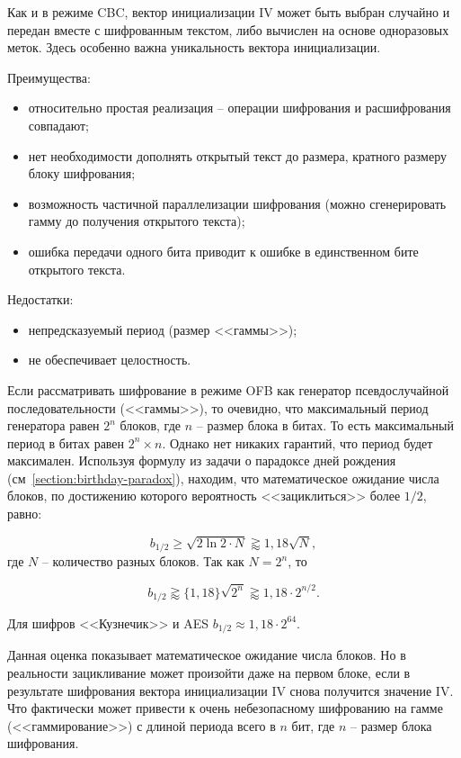 Как и в режиме CBC, вектор инициализации $\textrm{IV}$ может быть выбран случайно и передан вместе с шифрованным текстом, либо вычислен на основе одноразовых меток. Здесь особенно важна уникальность вектора инициализации.

Преимущества:
\begin{itemize}
	\item относительно простая реализация -- операции шифрования и расшифрования совпадают;
	\item нет необходимости дополнять открытый текст до размера, кратного размеру блоку шифрования;
	\item возможность частичной параллелизации шифрования (можно сгенерировать гамму до получения открытого текста);
	\item ошибка передачи одного бита приводит к ошибке в единственном бите открытого текста.
\end{itemize}

Недостатки:
\begin{itemize}
	\item непредсказуемый период (размер <<гаммы>>);
	\item не обеспечивает целостность.
\end{itemize}

Если рассматривать шифрование в режиме OFB как генератор псевдослучайной последовательности (<<гаммы>>), то очевидно, что максимальный период генератора равен $2^n$ блоков, где $n$ -- размер блока в битах. То есть максимальный период в битах равен $2^n \times n$. Однако нет никаких гарантий, что период будет максимален. Используя формулу из задачи о парадоксе дней рождения (см~\autoref{section:birthday-paradox}), находим, что математическое ожидание числа блоков, по достижению которого вероятность <<зациклиться>> более $1/2$, равно:

\[
b_{1/2} \geq \sqrt{2 \ln 2 \cdot N} \gtrapprox {1,18} \sqrt{N},
\]
где $N$ -- количество разных блоков. Так как $N = 2^n$, то

\[
b_{1/2} \gtrapprox \{1,18\} \sqrt{2^n} \gtrapprox {1,18} \cdot 2^{n/2}.
\]

Для шифров <<Кузнечик>> и AES $b_{1/2} \approx {1,18} \cdot 2^{64}$.

Данная оценка показывает математическое ожидание числа блоков. Но в реальности зацикливание может произойти даже на первом блоке, если в результате шифрования вектора инициализации $\textrm{IV}$ снова получится значение $\textrm{IV}$. Что фактически может привести к очень небезопасному шифрованию на гамме (<<гаммирование>>) с длиной периода всего в $n$ бит, где $n$ -- размер блока шифрования.

